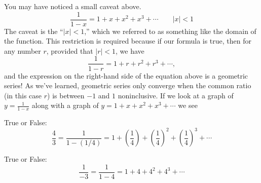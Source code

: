 \documentclass{ximera}
\begin{document}
You may have noticed a small caveat above.
\[
\frac{1}{1-x} = 1+ x+ x^2 + x^3 + \cdots \qquad |x|< 1
\]
The caveat is the ``$|x|<1$,''  which we referred to as something like the 
domain of the function. This restriction is required because if
our formula is true, then for any number $r$, provided that $|r|<1$, we have
\[
\frac{1}{1-r} = 1+ r+ r^2 + r^3 + \cdots,
\]
and the expression on the right-hand side of the equation above is a
geometric series! As we've learned, geometric
series only converge when the common ratio (in this case $r$) is
between $-1$ and $1$ noninclusive. If we look at a graph of $y = \frac{1}{1-x}$ along with a graph of $y = 1+ x+ x^2 + x^3 + \cdots$ we see
\begin{image}
\end{image}

\begin{question}
  True or False:
  \[
  \frac{4}{3} = \frac{1}{1-(1/4)} = 1 + \left(\frac{1}{4}\right)+ \left(\frac{1}{4}\right)^2+ \left(\frac{1}{4}\right)^3 + \cdots
  \]
  \begin{prompt}
  \begin{multipleChoice}
  \end{multipleChoice}
  \end{prompt}
  \begin{question}
    True or False:
    \[
    \frac{1}{-3} = \frac{1}{1-4} = 1 + 4+ 4^2+ 4^3 + \cdots
    \]
    \begin{prompt}
      \begin{multipleChoice}
      \end{multipleChoice}
    \end{prompt}
\end{question}
\end{question}
\end{document}
